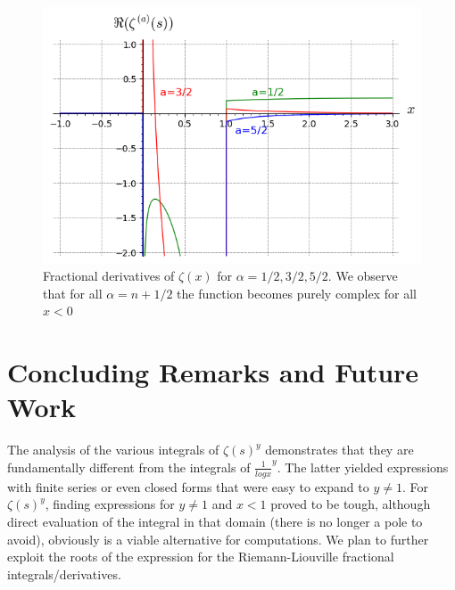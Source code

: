 \documentclass[a4paper,11pt,twoside]{amsart}
\begin{document}
\begin{figure}[H]
  \includegraphics[width=0.9\linewidth]{fracderzeta.png}
  \caption{Fractional derivatives of $\zeta(x)$ for $\alpha=1/2, 3/2, 5/2$. We observe that for all $\alpha = n + 1/2$ the function becomes purely complex for all $ x < 0$}
\end{figure}

  
\section{Concluding Remarks and Future Work}

The analysis of the various integrals of $\zeta(s)^y$ demonstrates that they are fundamentally different from the integrals of $\frac{1}{log x}^y$. The latter yielded expressions with finite series or even closed forms that were easy to expand to $y \ne 1$. For $\zeta(s)^{y}$, finding expressions for $y \ne 1$ and $x < 1$ proved to be tough, although direct evaluation of the integral in that domain (there is no longer a pole to avoid), obviously is a viable alternative for computations. We plan to further exploit the roots of the expression for the Riemann-Liouville fractional integrals/derivatives.
\end{document}
